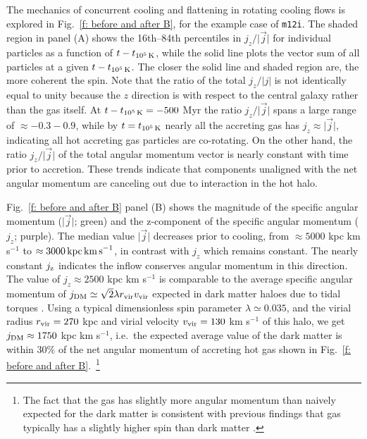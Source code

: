 \documentclass[fleqn,usenatbib]{mnras}
\newcommand{\tcools}{t_{10^5\,{\rm K}}}
\newcommand{\Rvir}{r_{\rm vir}}
\newcommand{\vvir}{v_{\rm vir}}
\begin{document}
The mechanics of concurrent cooling and flattening in rotating cooling flows is explored in Fig.~\ref{f: before and after B}, for the example case of \texttt{m12i}.
The shaded region in panel (A) shows the 16th--84th percentiles in $j_z/\vert\vec j\vert$ for individual particles as a function of $t-\tcools$, while the solid line plots the vector sum of all particles at a given $t-\tcools$. The closer the solid line and shaded region are, the more coherent the spin.
Note that the ratio of the total $j_z/\vert j \vert$ is not identically equal to unity because the $z$ direction is with respect to the central galaxy rather than the gas itself.
At $t-\tcools=-500$ Myr the ratio $j_z/\vert\vec j\vert$ spans a large range of $\approx -0.3 - 0.9$, while by $t=\tcools$ nearly all the accreting gas has $j_z\approx\vert\vec j\vert$, indicating all hot accreting gas particles are co-rotating.
On the other hand, the ratio $j_z/\vert\vec j\vert$ of the total angular momentum vector is nearly constant with time prior to accretion. 
These trends indicate that components unaligned with the net angular momentum are canceling out due to interaction in the hot halo.

Fig.~\ref{f: before and after B} panel (B) shows the magnitude of the specific angular momentum ($\vert \vec j \vert$; green) and the z-component of the specific angular momentum ($j_z$; purple).
The median value $\vert \vec j \vert$ decreases prior to cooling, from $\approx 5000$ kpc km s$^{-1}$ to $\approx 3000\,{\rm kpc\,km\,s}^{-1}$, in contrast with  $j_z$ which remains constant.
The nearly constant $j_{\rm z}$ indicates the inflow conserves angular momentum in this direction. 
The value of $j_z\approx 2500$ kpc km s$^{-1}$ is comparable to the average specific angular momentum of $j_{\rm DM} \simeq \sqrt{2}\lambda \Rvir \vvir$ expected in dark matter haloes due to tidal torques \citep[e.g.][]{Bullock2001}.
Using a typical dimensionless spin parameter $\lambda \simeq 0.035$, and the virial radius $\Rvir=270$ kpc and virial velocity $\vvir=130$ km s$^{-1}$ of this halo, we get $j_{\rm DM}\approx1750$ kpc km s$^{-1}$, i.e.~the expected average value of the dark matter is within $30\%$ of the net angular momentum of accreting hot gas shown in Fig.~\ref{f: before and after B}.~\footnote{The fact that the gas has slightly more angular momentum than naively expected for the dark matter is consistent with previous findings that gas typically has a slightly higher spin than dark matter \citep[e.g.][]{Stewart2017}.}
\end{document}
